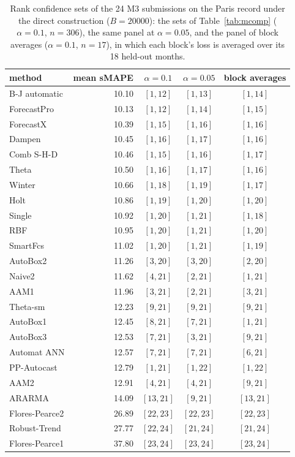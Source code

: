 \begin{table}[htb]
  \centering
  \caption[M3 Paris record: robustness of the rank sets]{Rank confidence sets of the 24 M3 submissions on the Paris record under the direct construction ($B=20000$): the sets of Table~\ref{tab:mcomp} ($\alpha=0.1$, $n=306$), the same panel at $\alpha=0.05$, and the panel of block averages ($\alpha=0.1$, $n=17$), in which each block's loss is averaged over its 18 held-out months.}
  \label{tab:app-m3-robust}
  \small
  \begin{tabular}{lrccc}
    \toprule
    method & mean sMAPE & $\alpha=0.1$ & $\alpha=0.05$ & block averages\\
    \midrule
    B-J automatic & 10.10 & $[1,12]$ & $[1,13]$ & $[1,14]$\\
    ForecastPro & 10.13 & $[1,12]$ & $[1,14]$ & $[1,15]$\\
    ForecastX & 10.39 & $[1,15]$ & $[1,16]$ & $[1,16]$\\
    Dampen & 10.45 & $[1,16]$ & $[1,17]$ & $[1,16]$\\
    Comb S-H-D & 10.46 & $[1,15]$ & $[1,16]$ & $[1,17]$\\
    Theta & 10.50 & $[1,16]$ & $[1,17]$ & $[1,16]$\\
    Winter & 10.66 & $[1,18]$ & $[1,19]$ & $[1,17]$\\
    Holt & 10.86 & $[1,19]$ & $[1,20]$ & $[1,20]$\\
    Single & 10.92 & $[1,20]$ & $[1,21]$ & $[1,18]$\\
    RBF & 10.95 & $[1,20]$ & $[1,21]$ & $[1,20]$\\
    SmartFcs & 11.02 & $[1,20]$ & $[1,21]$ & $[1,19]$\\
    AutoBox2 & 11.26 & $[3,20]$ & $[3,20]$ & $[2,20]$\\
    Naive2 & 11.62 & $[4,21]$ & $[2,21]$ & $[1,21]$\\
    AAM1 & 11.96 & $[3,21]$ & $[2,21]$ & $[3,21]$\\
    Theta-sm & 12.23 & $[9,21]$ & $[9,21]$ & $[9,21]$\\
    AutoBox1 & 12.45 & $[8,21]$ & $[7,21]$ & $[1,21]$\\
    AutoBox3 & 12.53 & $[7,21]$ & $[3,21]$ & $[9,21]$\\
    Automat ANN & 12.57 & $[7,21]$ & $[7,21]$ & $[6,21]$\\
    PP-Autocast & 12.79 & $[1,21]$ & $[1,22]$ & $[1,22]$\\
    AAM2 & 12.91 & $[4,21]$ & $[4,21]$ & $[9,21]$\\
    ARARMA & 14.09 & $[13,21]$ & $[9,21]$ & $[13,21]$\\
    Flores-Pearce2 & 26.89 & $[22,23]$ & $[22,23]$ & $[22,23]$\\
    Robust-Trend & 27.77 & $[22,24]$ & $[21,24]$ & $[21,24]$\\
    Flores-Pearce1 & 37.80 & $[23,24]$ & $[23,24]$ & $[23,24]$\\
    \bottomrule
  \end{tabular}
\end{table}
